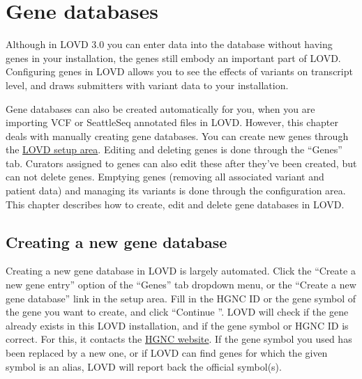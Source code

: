 \documentclass[a4paper,oneside,openany,12pt]{memoir}
\renewenvironment{leftbar}[1][\hsize]
{%
    \def\FrameCommand
    {%
        {\color{LOVDdark}\vrule width 3pt \hspace{5pt}}%
        \colorbox{LOVDlight}%
    }%
    \MakeFramed{\hsize#1\advance\hsize-\width\FrameRestore}%
}
{\endMakeFramed}
\begin{document}
\chapter{Gene databases}
Although in LOVD 3.0 you can enter data into the database without having genes in your installation, the genes still embody an important part of LOVD.
Configuring genes in LOVD allows you to see the effects of variants on transcript level, and draws submitters with variant data to your installation.

Gene databases can also be created automatically for you, when you are importing VCF or SeattleSeq annotated files in LOVD.
However, this chapter deals with manually creating gene databases.
You can create new genes through the \hyperlink{chap:setup}{LOVD setup area}.
Editing and deleting genes is done through the ``Genes'' tab.
Curators assigned to genes can also edit these after they've been created, but can not delete genes.
Emptying genes (removing all associated variant and patient data) and managing its variants is done through the configuration area.
This chapter describes how to create, edit and delete gene databases in LOVD.





\hypertarget{sec:gene_create}{}
\section{Creating a new gene database}
Creating a new gene database in LOVD is largely automated.
Click the ``Create a new gene entry'' option of the ``Genes'' tab dropdown menu, or the ``Create a new gene database'' link in the setup area.
Fill in the HGNC ID or the gene symbol of the gene you want to create, and click ``Continue \guillemotright''.
LOVD will check if the gene already exists in this LOVD installation, and if the gene symbol or HGNC ID is correct.
For this, it contacts the \href{http://www.genenames.org/}{HGNC website}.
If the gene symbol you used has been replaced by a new one, or if LOVD can find genes for which the given symbol is an alias,
 LOVD will report back the official symbol(s).
\end{document}
